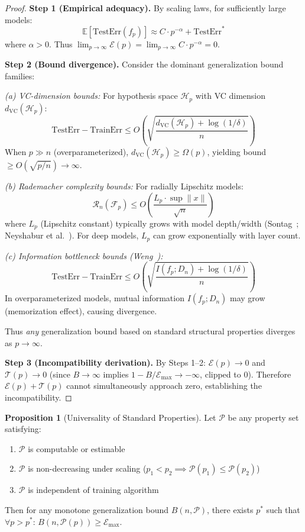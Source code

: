 \documentclass[12pt]{article}
\newcommand{\E}{\mathbb{E}}
\newcommand{\Hcal}{\mathcal{H}}
\newcommand{\Pcal}{\mathcal{P}}
\newcommand{\Fcal}{\mathcal{F}}
\theoremstyle{definition}
\newtheorem{proposition}[definition]{Proposition}
\theoremstyle{remark}
\begin{document}
\begin{proof}
\textbf{Step 1 (Empirical adequacy).} By scaling laws, for sufficiently large models:
\[
\E[\text{TestErr}(f_p)] \approx C \cdot p^{-\alpha} + \text{TestErr}^*
\]
where $\alpha > 0$. Thus $\lim_{p \to \infty} \mathcal{E}(p) = \lim_{p \to \infty} C \cdot p^{-\alpha} = 0$.

\textbf{Step 2 (Bound divergence).} Consider the dominant generalization bound families:

\emph{(a) VC-dimension bounds:} For hypothesis space $\Hcal_p$ with VC dimension $d_{\text{VC}}(\Hcal_p)$:
\[
\text{TestErr} - \text{TrainErr} \leq O\left(\sqrt{\frac{d_{\text{VC}}(\Hcal_p) + \log(1/\delta)}{n}}\right)
\]
When $p \gg n$ (overparameterized), $d_{\text{VC}}(\Hcal_p) \geq \Omega(p)$, yielding bound $\geq O(\sqrt{p/n}) \to \infty$.

\emph{(b) Rademacher complexity bounds:} For radially Lipschitz models:
\[
\mathcal{R}_n(\Fcal_p) \leq O\left(\frac{L_p \cdot \sup\|x\|}{\sqrt{n}}\right)
\]
where $L_p$ (Lipschitz constant) typically grows with model depth/width (Sontag~\cite{sontag1998networks}; Neyshabur et al.~\cite{neyshabur2015capacity}). For deep models, $L_p$ can grow exponentially with layer count.

\emph{(c) Information bottleneck bounds (Weng~\cite{weng2020information}):}
\[
\text{TestErr} - \text{TrainErr} \leq O\left(\sqrt{\frac{I(f_p; D_n) + \log(1/\delta)}{n}}\right)
\]
In overparameterized models, mutual information $I(f_p; D_n)$ may grow (memorization effect), causing divergence.

Thus \emph{any} generalization bound based on standard structural properties diverges as $p \to \infty$.

\textbf{Step 3 (Incompatibility derivation).} By Steps 1--2: $\mathcal{E}(p) \to 0$ and $\mathcal{T}(p) \to 0$ (since $B \to \infty$ implies $1 - B/\mathcal{E}_{\max} \to -\infty$, clipped to $0$). Therefore $\mathcal{E}(p) + \mathcal{T}(p)$ cannot simultaneously approach zero, establishing the incompatibility.
\end{proof}

\begin{proposition}[Universality of Standard Properties]\label{prop:universal}
Let $\Pcal$ be any property set satisfying:
\begin{enumerate}
  \item $\Pcal$ is computable or estimable
  \item $\Pcal$ is non-decreasing under scaling ($p_1 < p_2 \implies \Pcal(p_1) \leq \Pcal(p_2)$)
  \item $\Pcal$ is independent of training algorithm
\end{enumerate}
Then for any monotone generalization bound $B(n, \Pcal)$, there exists $p^*$ such that $\forall p > p^*$: $B(n, \Pcal(p)) \geq \mathcal{E}_{\max}$.
\end{proposition}
\end{document}
